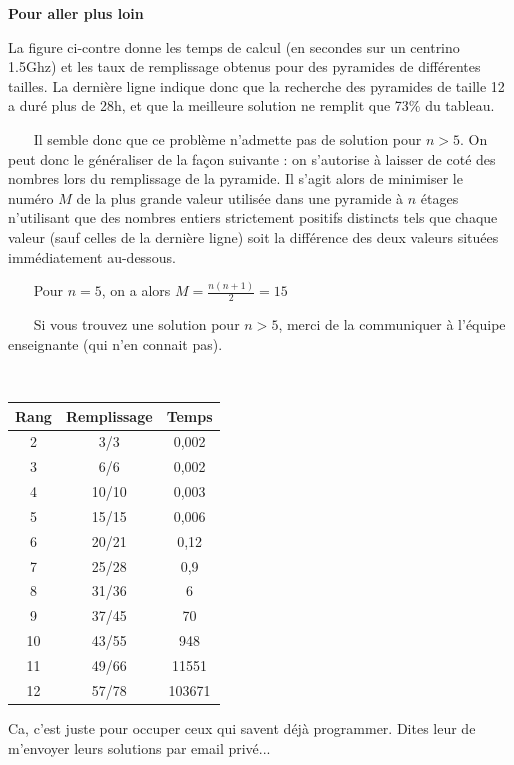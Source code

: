 \documentclass[10pt]{article}\usepackage[correction,nu]{esial}
\begin{document}
\begin{Exercice}\textbf{Pour aller plus loin}

\noindent\begin{minipage}{.7\linewidth}
    
  La figure ci-contre donne les temps de calcul (en secondes sur un centrino
  1.5Ghz) et les taux de remplissage obtenus pour des pyramides de différentes
  tailles. La dernière ligne indique donc que la recherche des pyramides de
  taille 12 a duré plus de 28h, et que la meilleure solution ne remplit que
  73\% du tableau.

  ~~~ Il semble donc que ce problème n'admette pas de solution pour $n>5$. On
  peut donc le généraliser de la façon suivante : on s'autorise à laisser de
  coté des nombres lors du remplissage de la pyramide. Il s'agit alors de
  minimiser le numéro $M$ de la plus grande valeur utilisée dans une pyramide à
  $n$ étages n'utilisant que des nombres entiers strictement positifs distincts
  tels que chaque valeur (sauf celles de la dernière ligne) soit la différence
  des deux valeurs situées immédiatement au-dessous.

  ~~~ Pour $n=5$, on a alors $M=\frac{n(n+1)}{2}=15$

  ~~~ Si vous trouvez une solution pour $n>5$, merci de la communiquer à
  l'équipe enseignante (qui n'en connait pas).

    
  \end{minipage}~~~\begin{minipage}{.3\linewidth}
\begin{tabular}{|c|c|c|}
\hline
Rang & Remplissage & Temps\\
\hline
 2 &  3/3  & 0,002\\
 3 &  6/6  & 0,002\\
 4 & 10/10 & 0,003\\
 5 & 15/15 & 0,006\\
 6 & 20/21 & 0,12 \\
 7 & 25/28 & 0,9  \\
 8 & 31/36 & 6    \\
 9 & 37/45 & 70   \\
10 & 43/55 & 948  \\
11 & 49/66 & 11551\\
12 & 57/78 & 103671\\
\hline
\end{tabular}

  \end{minipage}
  

\end{Exercice}

\begin{Reponse}
  Ca, c'est juste pour occuper ceux qui savent déjà programmer. Dites leur de
  m'envoyer leurs solutions par email privé...
\end{Reponse}
\end{document}
